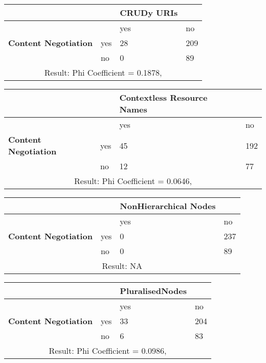 \documentclass[a4paper,12pt]{article}
\begin{document}
\begin{center}
  \begin{tabular}{| p{60mm} | p{10mm} | p{35mm} | p{35mm} |}
  \hline
   & & \textbf{CRUDy URIs} &
  \\
  \hline
  & & yes & no
  \\
  \hline
  \textbf{Content Negotiation} & yes & 28 & 209
  \\
  \hline
   & no & 0 & 89
  \\
  \hline
  \multicolumn{4}{|c|}{Result: Phi Coefficient = 0.1878, }
  \\ \hline
  \end{tabular}
  \end{center}

\begin{center}
  \begin{tabular}{| p{60mm} | p{10mm} | p{35mm} | p{35mm} |}
  \hline
   & & \textbf{Contextless Resource Names} &
  \\
  \hline
  & & yes & no
  \\
  \hline
  \textbf{Content Negotiation} & yes & 45 & 192
  \\
  \hline
   & no & 12 & 77
  \\
  \hline
  \multicolumn{4}{|c|}{Result: Phi Coefficient = 0.0646, }
  \\ \hline
  \end{tabular}
  \end{center}

\begin{center}
  \begin{tabular}{| p{60mm} | p{10mm} | p{35mm} | p{35mm} |}
  \hline
   & & \textbf{NonHierarchical Nodes} &
  \\
  \hline
  & & yes & no
  \\
  \hline
  \textbf{Content Negotiation} & yes & 0 & 237
  \\
  \hline
   & no & 0 & 89
  \\
  \hline
  \multicolumn{4}{|c|}{Result: NA}
  \\ \hline
  \end{tabular}
  \end{center}

\begin{center}
  \begin{tabular}{| p{60mm} | p{10mm} | p{35mm} | p{35mm} |}
  \hline
   & & \textbf{PluralisedNodes} &
  \\
  \hline
  & & yes & no
  \\
  \hline
  \textbf{Content Negotiation} & yes & 33 & 204
  \\
  \hline
   & no & 6 & 83
  \\
  \hline
  \multicolumn{4}{|c|}{Result: Phi Coefficient = 0.0986, }
  \\ \hline
  \end{tabular}
  \end{center}
\end{document}
